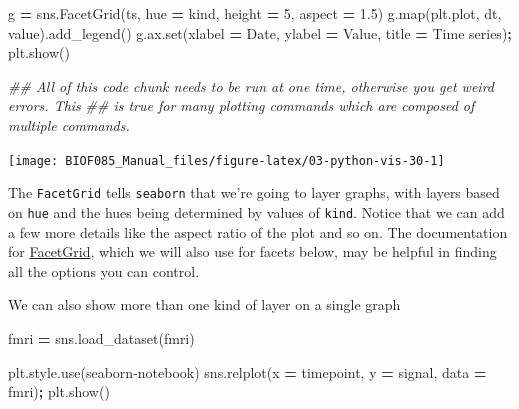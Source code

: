 \documentclass[
  letterpaper,
]{scrbook}
\newenvironment{Shaded}{\begin{snugshade}}{\end{snugshade}}
\newcommand{\BuiltInTok}[1]{#1}
\newcommand{\CommentTok}[1]{\textcolor[rgb]{0.56,0.35,0.01}{\textit{#1}}}
\newcommand{\DecValTok}[1]{\textcolor[rgb]{0.00,0.00,0.81}{#1}}
\newcommand{\FloatTok}[1]{\textcolor[rgb]{0.00,0.00,0.81}{#1}}
\newcommand{\NormalTok}[1]{#1}
\newcommand{\OperatorTok}[1]{\textcolor[rgb]{0.81,0.36,0.00}{\textbf{#1}}}
\newcommand{\StringTok}[1]{\textcolor[rgb]{0.31,0.60,0.02}{#1}}
\begin{document}
\begin{Shaded}
\begin{Highlighting}[]
\NormalTok{g }\OperatorTok{=}\NormalTok{ sns.FacetGrid(ts, hue }\OperatorTok{=} \StringTok{\textquotesingle{}kind\textquotesingle{}}\NormalTok{, height }\OperatorTok{=} \DecValTok{5}\NormalTok{, aspect }\OperatorTok{=} \FloatTok{1.5}\NormalTok{)}
\NormalTok{g.}\BuiltInTok{map}\NormalTok{(plt.plot, }\StringTok{\textquotesingle{}dt\textquotesingle{}}\NormalTok{, }\StringTok{\textquotesingle{}value\textquotesingle{}}\NormalTok{).add\_legend()}
\NormalTok{g.ax.}\BuiltInTok{set}\NormalTok{(xlabel }\OperatorTok{=} \StringTok{\textquotesingle{}Date\textquotesingle{}}\NormalTok{,}
\NormalTok{        ylabel }\OperatorTok{=} \StringTok{\textquotesingle{}Value\textquotesingle{}}\NormalTok{,}
\NormalTok{        title }\OperatorTok{=} \StringTok{\textquotesingle{}Time series\textquotesingle{}}\NormalTok{)}\OperatorTok{;}
\NormalTok{plt.show()}

\CommentTok{\#\# All of this code chunk needs to be run at one time, otherwise you get weird errors. This}
\CommentTok{\#\# is true for many plotting commands which are composed of multiple commands. }
\end{Highlighting}
\end{Shaded}

\begin{center}\texttt{[image: BIOF085\_Manual\_files/figure-latex/03-python-vis-30-1]} \end{center}

The \texttt{FacetGrid} tells \texttt{seaborn} that we're going to layer graphs, with layers based on \texttt{hue} and the hues being determined by values of \texttt{kind}. Notice that we can add a few more details like the aspect ratio of the plot and so on. The documentation for \href{https://seaborn.pydata.org/generated/seaborn.FacetGrid.html}{FacetGrid}, which we will also use for facets below, may be helpful in finding all the options you can control.

We can also show more than one kind of layer on a single graph

\begin{Shaded}
\begin{Highlighting}[]
\NormalTok{fmri }\OperatorTok{=}\NormalTok{ sns.load\_dataset(}\StringTok{\textquotesingle{}fmri\textquotesingle{}}\NormalTok{)}
\end{Highlighting}
\end{Shaded}

\begin{Shaded}
\begin{Highlighting}[]
\NormalTok{plt.style.use(}\StringTok{\textquotesingle{}seaborn{-}notebook\textquotesingle{}}\NormalTok{)}
\NormalTok{sns.relplot(x }\OperatorTok{=} \StringTok{\textquotesingle{}timepoint\textquotesingle{}}\NormalTok{, y }\OperatorTok{=} \StringTok{\textquotesingle{}signal\textquotesingle{}}\NormalTok{, data }\OperatorTok{=}\NormalTok{ fmri)}\OperatorTok{;}
\NormalTok{plt.show()}
\end{Highlighting}
\end{Shaded}
\end{document}
